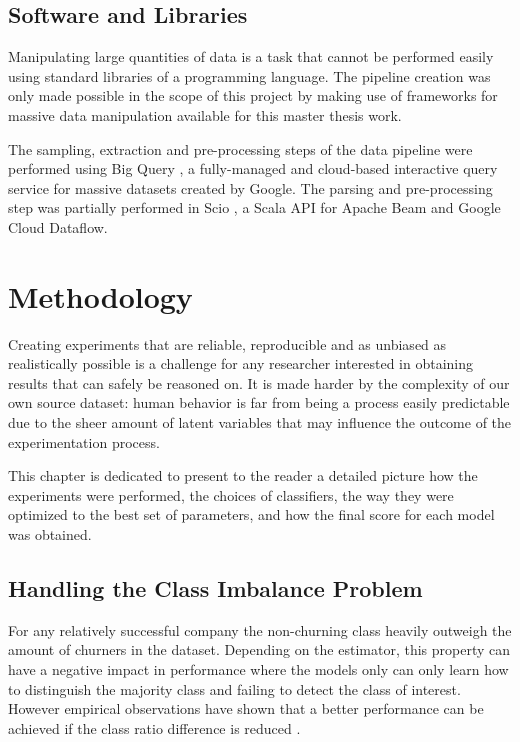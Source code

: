 \documentclass{kththesis}
\begin{document}
\section{Software and Libraries}

Manipulating large quantities of data is a task that cannot be performed easily using standard libraries of a programming language. The pipeline creation was only made possible in the scope of this project by making use of frameworks for massive data manipulation available for this master thesis work.

The sampling, extraction and pre-processing steps of the data pipeline were performed using Big Query \citep{sato2012inside}, a fully-managed and cloud-based interactive query service for massive datasets created by Google. The parsing and pre-processing step was partially performed in Scio \citep{scio}, a Scala API for Apache Beam and Google Cloud Dataflow.

\chapter{Methodology}
\label{cha:method}

Creating experiments that are reliable, reproducible and as unbiased as realistically possible is a challenge for any researcher interested in obtaining results that can safely be reasoned on. It is made harder by the complexity of our own source dataset: human behavior is far from being a process easily predictable due to the sheer amount of latent variables that may influence the outcome of the experimentation process.

This chapter is dedicated to present to the reader a detailed picture how the experiments were performed, the choices of classifiers, the way they were optimized to the best set of parameters, and how the final score for each model was obtained.

\section{Handling the Class Imbalance Problem}

For any relatively successful company the non-churning class heavily outweigh the amount of churners in the dataset. Depending on the estimator, this property can have a negative impact in performance where the models only can only learn how to distinguish the majority class and failing to detect the class of interest. However empirical observations have shown that a better performance can be achieved if the class ratio difference is reduced  \citep{Burez2009} \citep{ling1998data}. 
\end{document}
